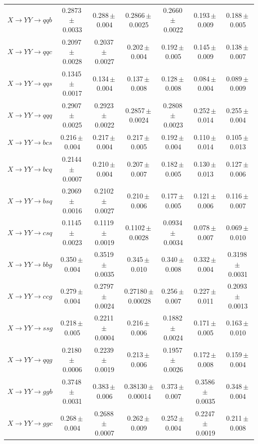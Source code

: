 \documentclass[12pt]{article}   %
\begin{document}
\begin{landscape}
{\begin{longtable}{@{\extracolsep{\fill}}lcccccc@{}}
$X\to YY\to qqb$ & 0.2873\,$\pm$\,0.0033 & 0.288\,$\pm$\,0.004 & 0.2866\,$\pm$\,0.0025 & 0.2660\,$\pm$\,0.0022 & 0.193\,$\pm$\,0.009 & 0.188\,$\pm$\,0.005 \\
$X\to YY\to qqc$ & 0.2097\,$\pm$\,0.0028 & 0.2037\,$\pm$\,0.0027 & 0.202\,$\pm$\,0.004 & 0.192\,$\pm$\,0.005 & 0.145\,$\pm$\,0.009 & 0.138\,$\pm$\,0.007 \\
$X\to YY\to qqs$ & 0.1345\,$\pm$\,0.0017 & 0.134\,$\pm$\,0.004 & 0.137\,$\pm$\,0.008 & 0.128\,$\pm$\,0.008 & 0.084\,$\pm$\,0.004 & 0.089\,$\pm$\,0.009 \\
$X\to YY\to qqq$ & 0.2907\,$\pm$\,0.0025 & 0.2923\,$\pm$\,0.0022 & 0.2857\,$\pm$\,0.0024 & 0.2808\,$\pm$\,0.0023 & 0.252\,$\pm$\,0.014 & 0.255\,$\pm$\,0.004 \\
$X\to YY\to bcs$ & 0.216\,$\pm$\,0.004 & 0.217\,$\pm$\,0.004 & 0.217\,$\pm$\,0.005 & 0.192\,$\pm$\,0.004 & 0.110\,$\pm$\,0.014 & 0.105\,$\pm$\,0.013 \\
$X\to YY\to bcq$ & 0.2144\,$\pm$\,0.0007 & 0.210\,$\pm$\,0.004 & 0.207\,$\pm$\,0.007 & 0.182\,$\pm$\,0.005 & 0.130\,$\pm$\,0.013 & 0.127\,$\pm$\,0.006 \\
$X\to YY\to bsq$ & 0.2069\,$\pm$\,0.0016 & 0.2102\,$\pm$\,0.0027 & 0.210\,$\pm$\,0.006 & 0.177\,$\pm$\,0.005 & 0.121\,$\pm$\,0.006 & 0.116\,$\pm$\,0.007 \\
$X\to YY\to csq$ & 0.1145\,$\pm$\,0.0023 & 0.1119\,$\pm$\,0.0019 & 0.1102\,$\pm$\,0.0028 & 0.0934\,$\pm$\,0.0034 & 0.078\,$\pm$\,0.007 & 0.069\,$\pm$\,0.010 \\
$X\to YY\to bbg$ & 0.350\,$\pm$\,0.004 & 0.3519\,$\pm$\,0.0035 & 0.345\,$\pm$\,0.010 & 0.340\,$\pm$\,0.008 & 0.332\,$\pm$\,0.004 & 0.3198\,$\pm$\,0.0031 \\
$X\to YY\to ccg$ & 0.279\,$\pm$\,0.004 & 0.2797\,$\pm$\,0.0024 & 0.27180\,$\pm$\,0.00028 & 0.256\,$\pm$\,0.007 & 0.227\,$\pm$\,0.011 & 0.2093\,$\pm$\,0.0013 \\
$X\to YY\to ssg$ & 0.218\,$\pm$\,0.005 & 0.2211\,$\pm$\,0.0004 & 0.216\,$\pm$\,0.006 & 0.1882\,$\pm$\,0.0024 & 0.171\,$\pm$\,0.005 & 0.163\,$\pm$\,0.010 \\
$X\to YY\to qqg$ & 0.2180\,$\pm$\,0.0006 & 0.2239\,$\pm$\,0.0019 & 0.213\,$\pm$\,0.006 & 0.1957\,$\pm$\,0.0026 & 0.172\,$\pm$\,0.008 & 0.159\,$\pm$\,0.004 \\
$X\to YY\to ggb$ & 0.3748\,$\pm$\,0.0031 & 0.383\,$\pm$\,0.006 & 0.38130\,$\pm$\,0.00014 & 0.373\,$\pm$\,0.007 & 0.3586\,$\pm$\,0.0035 & 0.348\,$\pm$\,0.004 \\
$X\to YY\to ggc$ & 0.268\,$\pm$\,0.004 & 0.2688\,$\pm$\,0.0007 & 0.262\,$\pm$\,0.009 & 0.252\,$\pm$\,0.004 & 0.2247\,$\pm$\,0.0019 & 0.211\,$\pm$\,0.008 \\

\end{longtable}}
\end{landscape}
\end{document}
